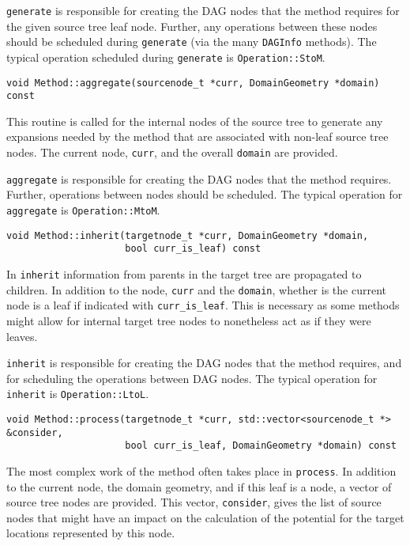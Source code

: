 \texttt{generate} is responsible for creating the DAG nodes that the method
requires for the given source tree leaf node. Further, any operations between
these nodes should be scheduled during \texttt{generate} (via the many
\texttt{DAGInfo} methods). The typical operation scheduled during
\texttt{generate} is \texttt{Operation::StoM}.


\begin{lstlisting}
void Method::aggregate(sourcenode_t *curr, DomainGeometry *domain) const
\end{lstlisting}


This routine is called for the internal nodes of the source tree to generate
any expansions needed by the method that are associated with non-leaf source
tree nodes. The current node, \texttt{curr}, and the overall \texttt{domain}
are provided.

\texttt{aggregate} is responsible for creating the DAG nodes that the method
requires. Further, operations between nodes should be scheduled. The typical
operation for \texttt{aggregate} is \texttt{Operation::MtoM}.

\begin{lstlisting}
void Method::inherit(targetnode_t *curr, DomainGeometry *domain, 
                     bool curr_is_leaf) const
\end{lstlisting}

In \texttt{inherit} information from parents in the target tree are propagated
to children. In addition to the node, \texttt{curr} and the \texttt{domain},
whether is the current node is a leaf if indicated with
\texttt{curr\_is\_leaf}. This is necessary as some methods might allow for
internal target tree nodes to nonetheless act as if they were leaves.

\texttt{inherit} is responsible for creating the DAG nodes that the method
requires, and for scheduling the operations between DAG nodes. The typical
operation for \texttt{inherit} is \texttt{Operation::LtoL}.


\begin{lstlisting}
void Method::process(targetnode_t *curr, std::vector<sourcenode_t *> &consider, 
                     bool curr_is_leaf, DomainGeometry *domain) const
\end{lstlisting}

The most complex work of the method often takes place in \texttt{process}. In
addition to the current node, the domain geometry, and if this leaf is a node,
a vector of source tree nodes are provided. This vector, \texttt{consider},
gives the list of source nodes that might have an impact on the calculation of
the potential for the target locations represented by this node.


